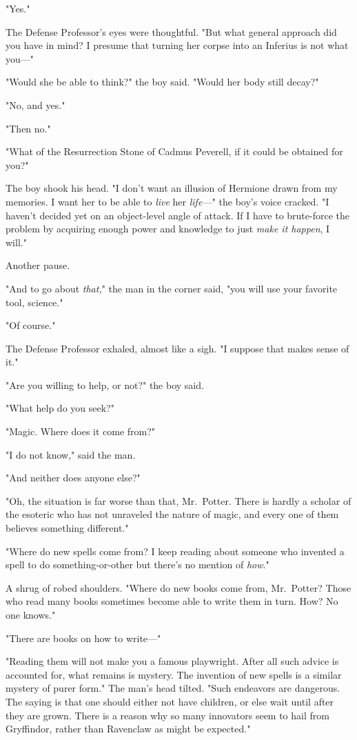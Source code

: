 "Yes."

The Defense Professor's eyes were thoughtful. "But what general approach did you have in mind? I presume that turning her corpse into an Inferius is not what you---"

"Would she be able to think?" the boy said. "Would her body still decay?"

"No, and yes."

"Then no."

"What of the Resurrection Stone of Cadmus Peverell, if it could be obtained for you?"

The boy shook his head. "I don't want an illusion of Hermione drawn from my memories. I want her to be able to \emph{live} her\emph{ life---}" the boy's voice cracked. "I haven't decided yet on an object-level angle of attack. If I have to brute-force the problem by acquiring enough power and knowledge to just \emph{make it happen}, I will."

Another pause.

"And to go about \emph{that,}" the man in the corner said, "you will use your favorite tool, science."

"Of course."

The Defense Professor exhaled, almost like a sigh. "I suppose that makes sense of it."

"Are you willing to help, or not?" the boy said.

"What help do you seek?"

"Magic. Where does it come from?"

"I do not know," said the man.

"And neither does anyone else?"

"Oh, the situation is far worse than that, Mr.~Potter. There is hardly a scholar of the esoteric who has not unraveled the nature of magic, and every one of them believes something different."

"Where do new spells come from? I keep reading about someone who invented a spell to do something-or-other but there's no mention of \emph{how}."

A shrug of robed shoulders. "Where do new books come from, Mr.~Potter? Those who read many books sometimes become able to write them in turn. How? No one knows."

"There are books on how to write---"

"Reading them will not make you a famous playwright. After all such advice is accounted for, what remains is mystery. The invention of new spells is a similar mystery of purer form." The man's head tilted. "Such endeavors are dangerous. The saying is that one should either not have children, or else wait until after they are grown. There is a reason why so many innovators seem to hail from Gryffindor, rather than Ravenclaw as might be expected."

